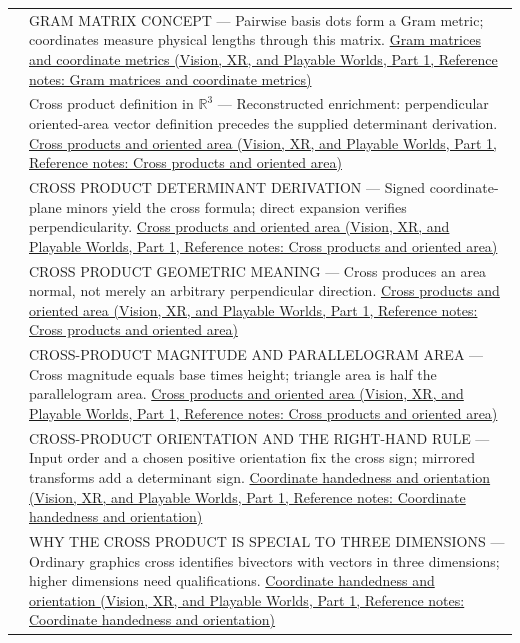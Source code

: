 {\begin{longtable}[]{@{}
  >{\raggedright\arraybackslash}p{}
  >{\raggedright\arraybackslash}p{}@{}}
541 & GRAM MATRIX CONCEPT --- Pairwise basis dots form a Gram metric; coordinates measure physical lengths through this matrix. \href{../07-Vision-XR-and-Playable-Worlds-P01/main.pdf\#appendix-3b863809f82a}{Gram matrices and coordinate metrics (Vision, XR, and Playable Worlds, Part 1, Reference notes: Gram matrices and coordinate metrics)} \\
542 & Cross product definition in \(\mathbb R^3\) --- Reconstructed enrichment: perpendicular oriented-area vector definition precedes the supplied determinant derivation. \href{../07-Vision-XR-and-Playable-Worlds-P01/main.pdf\#appendix-2391db8052b1}{Cross products and oriented area (Vision, XR, and Playable Worlds, Part 1, Reference notes: Cross products and oriented area)} \\
543 & CROSS PRODUCT DETERMINANT DERIVATION --- Signed coordinate-plane minors yield the cross formula; direct expansion verifies perpendicularity. \href{../07-Vision-XR-and-Playable-Worlds-P01/main.pdf\#appendix-2391db8052b1}{Cross products and oriented area (Vision, XR, and Playable Worlds, Part 1, Reference notes: Cross products and oriented area)} \\
544 & CROSS PRODUCT GEOMETRIC MEANING --- Cross produces an area normal, not merely an arbitrary perpendicular direction. \href{../07-Vision-XR-and-Playable-Worlds-P01/main.pdf\#appendix-2391db8052b1}{Cross products and oriented area (Vision, XR, and Playable Worlds, Part 1, Reference notes: Cross products and oriented area)} \\
545 & CROSS-PRODUCT MAGNITUDE AND PARALLELOGRAM AREA --- Cross magnitude equals base times height; triangle area is half the parallelogram area. \href{../07-Vision-XR-and-Playable-Worlds-P01/main.pdf\#appendix-2391db8052b1}{Cross products and oriented area (Vision, XR, and Playable Worlds, Part 1, Reference notes: Cross products and oriented area)} \\
546 & CROSS-PRODUCT ORIENTATION AND THE RIGHT-HAND RULE --- Input order and a chosen positive orientation fix the cross sign; mirrored transforms add a determinant sign. \href{../07-Vision-XR-and-Playable-Worlds-P01/main.pdf\#appendix-87d7626c8d37}{Coordinate handedness and orientation (Vision, XR, and Playable Worlds, Part 1, Reference notes: Coordinate handedness and orientation)} \\
547 & WHY THE CROSS PRODUCT IS SPECIAL TO THREE DIMENSIONS --- Ordinary graphics cross identifies bivectors with vectors in three dimensions; higher dimensions need qualifications. \href{../07-Vision-XR-and-Playable-Worlds-P01/main.pdf\#appendix-87d7626c8d37}{Coordinate handedness and orientation (Vision, XR, and Playable Worlds, Part 1, Reference notes: Coordinate handedness and orientation)} \\

\end{longtable}}
